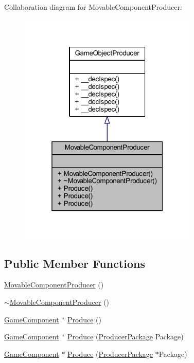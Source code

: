Collaboration diagram for Movable\-Component\-Producer\-:\nopagebreak
\begin{figure}[H]
\begin{center}
\leavevmode
\includegraphics[width=241pt]{class_movable_component_producer__coll__graph}
\end{center}
\end{figure}
\subsection*{Public Member Functions}
\begin{DoxyCompactItemize}
\item 
\hyperlink{class_movable_component_producer_a07b6c93cae31db6a684257b339e330b3}{Movable\-Component\-Producer} ()
\item 
\hyperlink{class_movable_component_producer_aa4219b366ab0626663174b5da191eaad}{$\sim$\-Movable\-Component\-Producer} ()
\item 
\hyperlink{class_game_component}{Game\-Component} $\ast$ \hyperlink{class_movable_component_producer_afcef390a20c515da93a8ef1971e59b90}{Produce} ()
\item 
\hyperlink{class_game_component}{Game\-Component} $\ast$ \hyperlink{class_movable_component_producer_a909d2617235b049286660251050e7e8b}{Produce} (\hyperlink{class_producer_package}{Producer\-Package} Package)
\item 
\hyperlink{class_game_component}{Game\-Component} $\ast$ \hyperlink{class_movable_component_producer_a1b83286374915b711d4b8f55cc024cbc}{Produce} (\hyperlink{class_producer_package}{Producer\-Package} $\ast$Package)
\end{DoxyCompactItemize}


